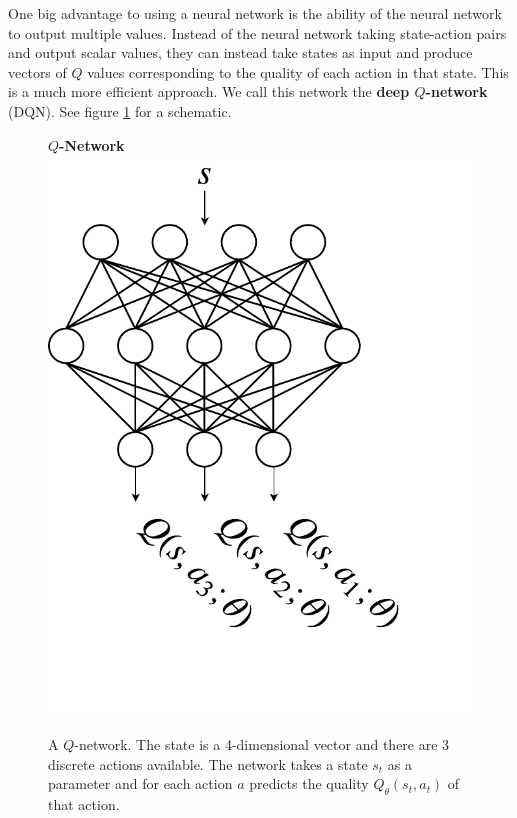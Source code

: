 \documentclass[journal, onecolumn, 12pt, draftclsnofoot]{IEEEtran}
\newcommand{\kword}[1]{\textbf{#1}}
\begin{document}
		\par One big advantage to using a neural network is the ability of the neural network to output multiple values. Instead of the neural network taking state-action pairs and output scalar values, they can instead take states as input and produce vectors of $Q$ values corresponding to the quality of each action in that state. This is a much more efficient approach. We call this network the \kword{deep $Q$-network} (DQN). See figure \ref{fig:q-network-state-to-many-actions} for a schematic.
		\begin{figure}[ht]
			\begin{center}
				\textbf{$Q$-Network} \\
			\includegraphics[scale=0.75]{fig/q-network-state-to-many-actions.pdf}
			\end{center}
			\caption{A $Q$-network. The state is a 4-dimensional vector and there are 3 discrete actions available. The network takes a state $s_t$ as a parameter and for each action $a$ predicts the quality $Q_\theta (s_t,a_t)$ of that action.}
			\label{fig:q-network-state-to-many-actions}
		\end{figure}
\end{document}
